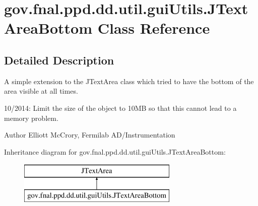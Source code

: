 \hypertarget{classgov_1_1fnal_1_1ppd_1_1dd_1_1util_1_1guiUtils_1_1JTextAreaBottom}{\section{gov.\-fnal.\-ppd.\-dd.\-util.\-gui\-Utils.\-J\-Text\-Area\-Bottom Class Reference}
\label{classgov_1_1fnal_1_1ppd_1_1dd_1_1util_1_1guiUtils_1_1JTextAreaBottom}
}


\subsection{Detailed Description}
A simple extension to the J\-Text\-Area class which tried to have the bottom of the area visible at all times.

10/2014\-: Limit the size of the object to 10\-M\-B so that this cannot lead to a memory problem.

\begin{DoxyAuthor}{Author}
Elliott Mc\-Crory, Fermilab A\-D/\-Instrumentation 
\end{DoxyAuthor}
Inheritance diagram for gov.\-fnal.\-ppd.\-dd.\-util.\-gui\-Utils.\-J\-Text\-Area\-Bottom\-:\begin{figure}[H]
\begin{center}
\leavevmode
\includegraphics[height=2.000000cm]{classgov_1_1fnal_1_1ppd_1_1dd_1_1util_1_1guiUtils_1_1JTextAreaBottom}
\end{center}
\end{figure}
